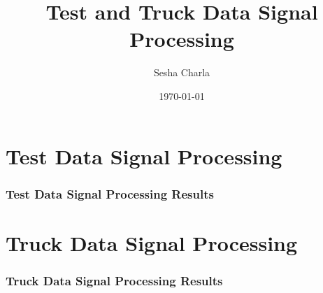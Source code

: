 \documentclass[letterpaper, 11pt]{article}
\title{Test and Truck Data Signal Processing}
\author{Sesha Charla}
\date{\today}
\begin{document}
\maketitle
\tableofcontents
\newpage

\newpage
\part{Test Data Signal Processing}

\newpage
\section{Test Data Signal Processing Results}






\newpage

\newpage
\part{Truck Data Signal Processing}

\newpage
\section{Truck Data Signal Processing Results}








\newpage

\newpage

\printbibliography
\end{document}
